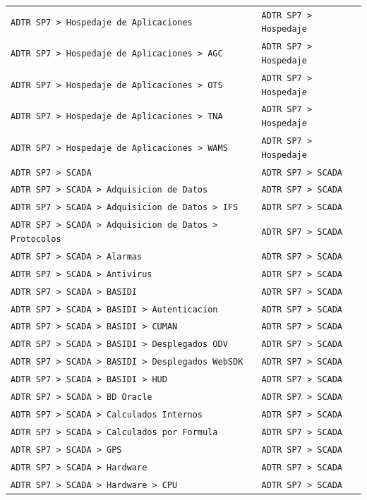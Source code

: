 \begin{longtable}{>{\raggedright\arraybackslash}p{} >{\raggedright\arraybackslash}p{}}
\texttt{ADTR SP7 > Hospedaje de Aplicaciones} & \texttt{ADTR SP7 > Hospedaje} \\
\texttt{ADTR SP7 > Hospedaje de Aplicaciones > AGC} & \texttt{ADTR SP7 > Hospedaje} \\
\texttt{ADTR SP7 > Hospedaje de Aplicaciones > OTS} & \texttt{ADTR SP7 > Hospedaje} \\
\texttt{ADTR SP7 > Hospedaje de Aplicaciones > TNA} & \texttt{ADTR SP7 > Hospedaje} \\
\texttt{ADTR SP7 > Hospedaje de Aplicaciones > WAMS} & \texttt{ADTR SP7 > Hospedaje} \\
\texttt{ADTR SP7 > SCADA} & \texttt{ADTR SP7 > SCADA} \\
\texttt{ADTR SP7 > SCADA > Adquisicion de Datos} & \texttt{ADTR SP7 > SCADA} \\
\texttt{ADTR SP7 > SCADA > Adquisicion de Datos > IFS} & \texttt{ADTR SP7 > SCADA} \\
\texttt{ADTR SP7 > SCADA > Adquisicion de Datos > Protocolos} & \texttt{ADTR SP7 > SCADA} \\
\texttt{ADTR SP7 > SCADA > Alarmas} & \texttt{ADTR SP7 > SCADA} \\
\texttt{ADTR SP7 > SCADA > Antivirus} & \texttt{ADTR SP7 > SCADA} \\
\texttt{ADTR SP7 > SCADA > BASIDI} & \texttt{ADTR SP7 > SCADA} \\
\texttt{ADTR SP7 > SCADA > BASIDI > Autenticacion} & \texttt{ADTR SP7 > SCADA} \\
\texttt{ADTR SP7 > SCADA > BASIDI > CUMAN} & \texttt{ADTR SP7 > SCADA} \\
\texttt{ADTR SP7 > SCADA > BASIDI > Desplegados ODV} & \texttt{ADTR SP7 > SCADA} \\
\texttt{ADTR SP7 > SCADA > BASIDI > Desplegados WebSDK} & \texttt{ADTR SP7 > SCADA} \\
\texttt{ADTR SP7 > SCADA > BASIDI > HUD} & \texttt{ADTR SP7 > SCADA} \\
\texttt{ADTR SP7 > SCADA > BD Oracle} & \texttt{ADTR SP7 > SCADA} \\
\texttt{ADTR SP7 > SCADA > Calculados Internos} & \texttt{ADTR SP7 > SCADA} \\
\texttt{ADTR SP7 > SCADA > Calculados por Formula} & \texttt{ADTR SP7 > SCADA} \\
\texttt{ADTR SP7 > SCADA > GPS} & \texttt{ADTR SP7 > SCADA} \\
\texttt{ADTR SP7 > SCADA > Hardware} & \texttt{ADTR SP7 > SCADA} \\
\texttt{ADTR SP7 > SCADA > Hardware > CPU} & \texttt{ADTR SP7 > SCADA} \\

\end{longtable}
